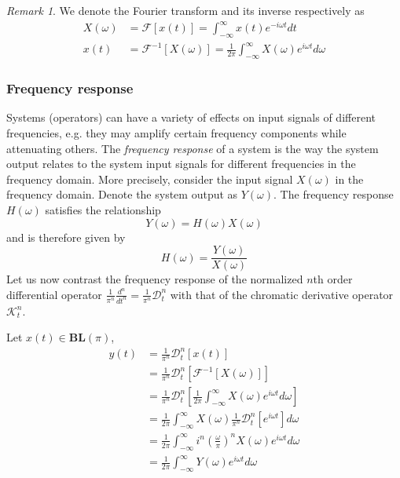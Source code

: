 \documentclass[11pt,oneside]{book}
\theoremstyle{plain}
\theoremstyle{definition}
\theoremstyle{remark}
\newtheorem*{remark}{Remark}
\begin{document}
\begin{remark}
We denote the Fourier transform and its inverse respectively as 
\begin{align}
  X(\omega) &= \mathcal{F}[x(t)] = \int_{-\infty}^{\infty} x(t) e^{-i \omega t} dt \\
  x(t)      &= \mathcal{F}^{-1}[X(\omega)] = \frac{1}{2 \pi} \int_{-\infty}^{\infty} X(\omega) e^{i \omega t} d\omega
\end{align}
\end{remark}

\subsubsection{Frequency response} \label{freq_response}

Systems (operators) can have a variety of effects on input signals of different frequencies, 
e.g. they may amplify certain frequency components while attenuating others. The \emph{frequency 
response} of a system is the way the system output relates to the system input signals for 
different frequencies in the frequency domain. More precisely, consider the input signal $X(\omega)$
in the frequency domain. Denote the system output as $Y(\omega)$. The frequency response $H(\omega)$ 
satisfies the relationship
\begin{equation}
  Y(\omega) = H(\omega) X(\omega)
\end{equation}
and is therefore given by
\begin{equation}
  H(\omega) = \frac{Y(\omega)}{X(\omega)}
\end{equation}
Let us now contrast the frequency response of the normalized $n$th order differential 
operator $\frac{1}{\pi^n} \frac{d^n}{dt^n} = \frac{1}{\pi^n} \mathcal{D}_t^n$ with that 
of the chromatic derivative operator $\mathcal{K}_t^n$.

Let $x(t) \in \mathbf{BL}(\pi)$,
\begin{align*}
  y(t) &= \frac{1}{\pi^n} \mathcal{D}_t^n[x(t)] \\
       &= \frac{1}{\pi^n} \mathcal{D}_t^n[\mathcal{F}^{-1}[X(\omega)]] \\
       &= \frac{1}{\pi^n} \mathcal{D}_t^n \left [ \frac{1}{2 \pi} \int_{-\infty}^{\infty} X(\omega) e^{i \omega t} d\omega \right ] \\
       &= \frac{1}{2 \pi} \int_{-\infty}^{\infty} X(\omega) \frac{1}{\pi^n} \mathcal{D}_t^n[e^{i \omega t}] d\omega \\
       &= \frac{1}{2 \pi} \int_{-\infty}^{\infty} i^n \left(\frac{\omega}{\pi}\right)^n X(\omega) e^{i\omega t} d\omega \\
       &= \frac{1}{2 \pi} \int_{-\infty}^{\infty} Y(\omega) e^{i\omega t} d\omega
\end{align*}
\end{document}
